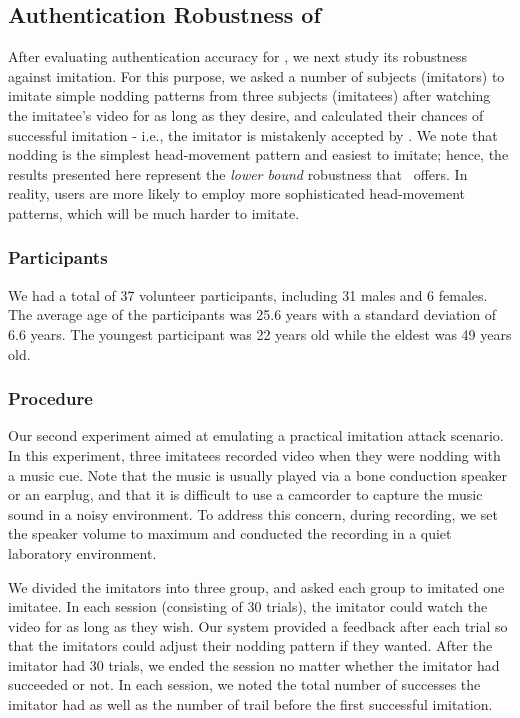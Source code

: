
\subsection{Authentication Robustness of \systemname} After evaluating authentication accuracy for \systemname, we next study its robustness against imitation. For this purpose, we asked a number of subjects (imitators) to imitate simple nodding patterns from three subjects (imitatees) after watching the imitatee's video for as long as they desire, and calculated their chances of successful imitation - i.e., the imitator is mistakenly accepted by \systemname. We note that nodding is the simplest head-movement pattern and easiest to imitate; hence, the results presented here represent the \emph{lower bound} robustness that \systemname~offers. In reality, users are more likely to employ more sophisticated head-movement patterns, which will be much harder to imitate.

\subsubsection{Participants}
We had a total of 37 volunteer participants, including 31 males and 6 females. The average age of the participants was 25.6 years with a standard deviation
of 6.6 years. The youngest participant was 22 years old while the eldest was 49 years old.

\subsubsection{Procedure}
Our second experiment aimed at emulating a practical imitation attack scenario. In this experiment, three imitatees recorded video when they were nodding with a music cue. Note that the music is usually played via a bone conduction speaker or an earplug, and that it is difficult to use a camcorder to capture the music sound in a noisy environment. To address this concern, during recording, we set the speaker volume to maximum and conducted the recording in a quiet laboratory environment.

We divided the imitators into three group, and asked each group to imitated one imitatee. In each session (consisting of 30 trials), the imitator could watch the video for as long as they wish. Our system provided a feedback after each trial so that the imitators could adjust their nodding pattern if they wanted. After the imitator had 30 trials,
we ended the session no matter whether the imitator had succeeded or not. In each session, we noted the total number of successes the imitator had as well as the number of trail before the first successful imitation. %

